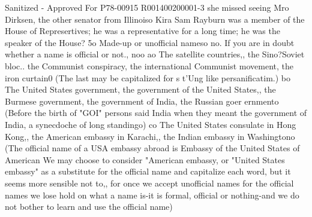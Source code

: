 \documentclass[
    oneside,
    11pt,
    draft
]{memoir}
\begin{document}
Sanitized - Approved For P78-00915 R001400200001-3 she missed seeing Mro Dirksen, the other senator from Illinoiso Kira Sam Rayburn was a member of the House of Represertives; he was a representative for a long time; he was the speaker of the House? 5o Made-up or unofficial nameso no. If you are in doubt whether a name is official or not., noo ao The satellite countries,, the Sino?Soviet bloc.. the Communist conspiracy, the international Communist movement, the iron curtain0 (The last may be capitalized for s t'Ung like persanificatim.) bo The United States government, the government of the United States,, the Burmese government, the government of India, the Russian goer ernmento (Before the birth of "GOI" persons said India when they meant the government of India, a synecdoche of long standingo) co The United States consulate in Hong Kong,, the American embassy in Karachi,, the Indian embassy in Washingtono (The official name of a USA embassy abroad is Embassy of the United States of American We may choose to consider "American embassy, or "United States embassy" as a substitute for the official name and capitalize each word, but it seems more sensible not to,, for once we accept unofficial names for the official names we lose hold on what a name is-it is formal, official or nothing-and we do not bother to learn and use the official name)
\end{document}
